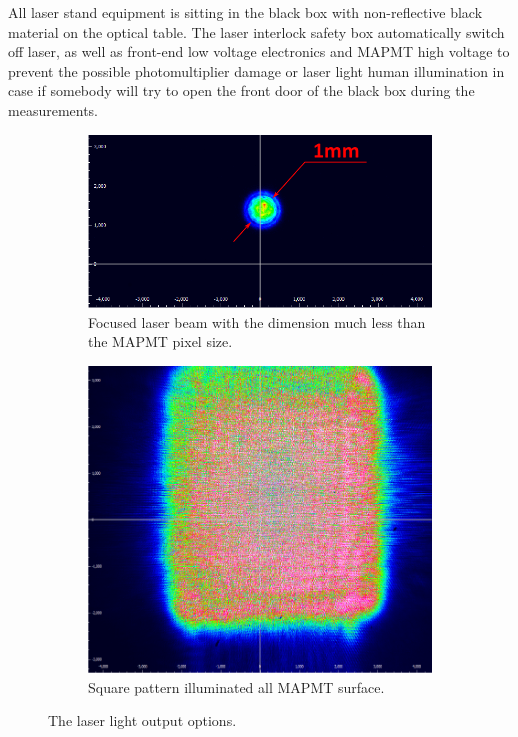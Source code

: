 All laser stand equipment is sitting in the black box with non-reflective black material on the optical table. The laser interlock safety box automatically switch off laser, as well as front-end low voltage  electronics and MAPMT high voltage to prevent the possible photomultiplier damage or laser light human illumination in case if somebody will try to open the front door of the black box during the measurements.

\begin{figure}[bt]
	\centering
	\begin{subfigure}[b]{0.628\linewidth}
		\includegraphics[width=\linewidth]{figures/beamspot.pdf}
		\caption{Focused laser beam with the dimension much less than the  MAPMT pixel size.}
		\label{fig:beamopt1}
	\end{subfigure}
	\begin{subfigure}[b]{0.354\linewidth}
		\includegraphics[width=\linewidth]{figures/beamsquare.pdf}
		\caption{Square pattern illuminated all MAPMT surface.}
		\label{fig:beamopt2}
	\end{subfigure}
	\caption{The laser light output options.}
\end{figure}

